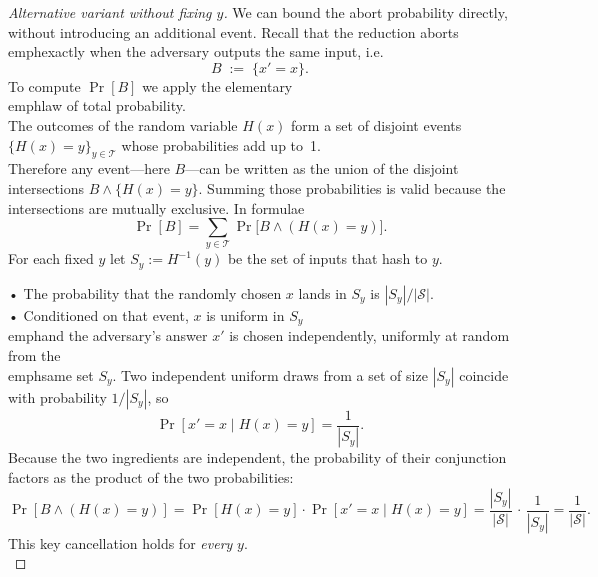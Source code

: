 
\begin{proof}[Alternative variant without fixing $y$]
We can bound the abort probability directly, without introducing an additional event.  Recall that the reduction aborts \\emph{exactly} when the adversary outputs the same input, i.e.
\[
  B \;:=\; \{x' = x\}.
\]
To compute $\Pr[B]$ we apply the elementary \\emph{law of total probability}.  \\
The outcomes of the random variable $H(x)$ form a set of disjoint events $\{H(x)=y\}_{y\in\mathcal T}$ whose probabilities add up to~1.  \\
Therefore any event—here $B$—can be written as the union of the disjoint intersections $B \wedge \{H(x)=y\}$.  Summing those probabilities is valid because the intersections are mutually exclusive.  In formulae
\[
  \Pr[B] = \sum_{y\in\mathcal T} \Pr\bigl[ B \wedge (H(x)=y) \bigr].
\]
For each fixed $y$ let $S_y := H^{-1}(y)$ be the set of inputs that hash to $y$.

•  The probability that the randomly chosen $x$ lands in $S_y$ is $|S_y|/|\mathcal S|$.  \\
•  Conditioned on that event, $x$ is uniform in $S_y$ \\emph{and} the adversary's answer $x'$ is chosen independently, uniformly at random from the \\emph{same} set $S_y$.  Two independent uniform draws from a set of size $|S_y|$ coincide with probability $1/|S_y|$, so
\[
  \Pr[x'=x\mid H(x)=y] = \frac{1}{|S_y|}.
\]
Because the two ingredients are independent, the probability of their conjunction factors as the product of the two probabilities:
\[
  \Pr[B \wedge (H(x)=y)] = \Pr[H(x)=y] \cdot \Pr[x'=x \mid H(x)=y] = \frac{|S_y|}{|\mathcal S|}\,\cdot\,\frac{1}{|S_y|}=\frac{1}{|\mathcal S|}.
\]
This key cancellation holds for \emph{every} $y$. \\
\end{proof}

